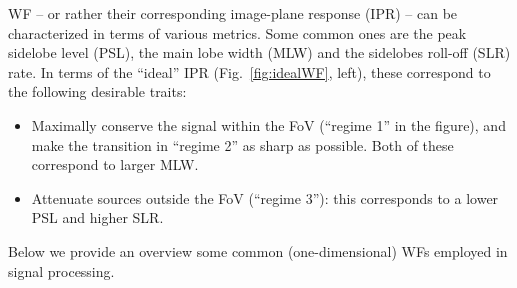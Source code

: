 \documentclass[useAMS,usenatbib]{mn2e}
\begin{document}
WF -- or rather their corresponding image-plane response (IPR) -- can be characterized in terms of various metrics. Some common 
ones are the peak sidelobe level (PSL), the main lobe width (MLW) and the sidelobes roll-off (SLR) rate. In terms of the ``ideal'' 
IPR (Fig.~\ref{fig:idealWF}, left), these correspond to the following desirable traits:

\begin{itemize}
\item Maximally conserve the signal within the FoV (``regime 1'' in the figure), and make the transition in ``regime 2'' as sharp as possible. Both of these correspond to larger MLW.
\item Attenuate sources outside the FoV (``regime 3''): this corresponds to a lower PSL and higher SLR.
\end{itemize}

Below we provide an overview some common (one-dimensional) WFs employed in signal processing.
\end{document}
